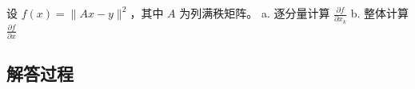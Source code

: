 \begin{example}[梯度计算]
    设 \(f(x) = \|Ax - y\|^2\)，其中 \(A\) 为列满秩矩阵。  
    a. 逐分量计算 \(\frac{\partial f}{\partial x_k}\)  
    b. 整体计算 \(\frac{\partial f}{\partial x}\)
    \end{example}
    
    \subsection*{解答过程}
    